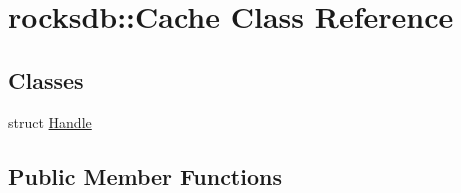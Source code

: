 \hypertarget{classrocksdb_1_1Cache}{}\section{rocksdb\+:\+:Cache Class Reference}
\label{classrocksdb_1_1Cache}
\subsection*{Classes}
\begin{DoxyCompactItemize}
\item 
struct \hyperlink{structrocksdb_1_1Cache_1_1Handle}{Handle}
\end{DoxyCompactItemize}
\subsection*{Public Member Functions}
